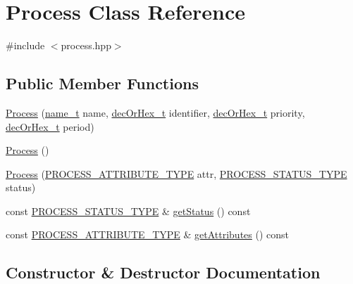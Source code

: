 \hypertarget{classProcess}{}\section{Process Class Reference}
\label{classProcess}


{\ttfamily \#include $<$process.\+hpp$>$}

\subsection*{Public Member Functions}
\begin{DoxyCompactItemize}
\item 
\hyperlink{classProcess_a60dea03f63b524f3d5ffeffab78d2d86}{Process} (\hyperlink{structname__t}{name\+\_\+t} name, \hyperlink{general__types_8hpp_a0edc3a86ddf4aa205c6882b61cd7b4e9}{dec\+Or\+Hex\+\_\+t} identifier, \hyperlink{general__types_8hpp_a0edc3a86ddf4aa205c6882b61cd7b4e9}{dec\+Or\+Hex\+\_\+t} priority, \hyperlink{general__types_8hpp_a0edc3a86ddf4aa205c6882b61cd7b4e9}{dec\+Or\+Hex\+\_\+t} period)
\item 
\hyperlink{classProcess_a9f4553eac74c657bb451f390c17d6bea}{Process} ()
\item 
\hyperlink{classProcess_a9033f4b620c1fc8521fb2e51353f8269}{Process} (\hyperlink{structPROCESS__ATTRIBUTE__TYPE}{P\+R\+O\+C\+E\+S\+S\+\_\+\+A\+T\+T\+R\+I\+B\+U\+T\+E\+\_\+\+T\+Y\+PE} attr, \hyperlink{structPROCESS__STATUS__TYPE}{P\+R\+O\+C\+E\+S\+S\+\_\+\+S\+T\+A\+T\+U\+S\+\_\+\+T\+Y\+PE} status)
\item 
const \hyperlink{structPROCESS__STATUS__TYPE}{P\+R\+O\+C\+E\+S\+S\+\_\+\+S\+T\+A\+T\+U\+S\+\_\+\+T\+Y\+PE} \& \hyperlink{classProcess_a70d2f9855b4fd3eae3288e18e376e747}{get\+Status} () const 
\item 
const \hyperlink{structPROCESS__ATTRIBUTE__TYPE}{P\+R\+O\+C\+E\+S\+S\+\_\+\+A\+T\+T\+R\+I\+B\+U\+T\+E\+\_\+\+T\+Y\+PE} \& \hyperlink{classProcess_a1a990dca63444f3e642ca6522ec35440}{get\+Attributes} () const 
\end{DoxyCompactItemize}


\subsection{Constructor \& Destructor Documentation}
